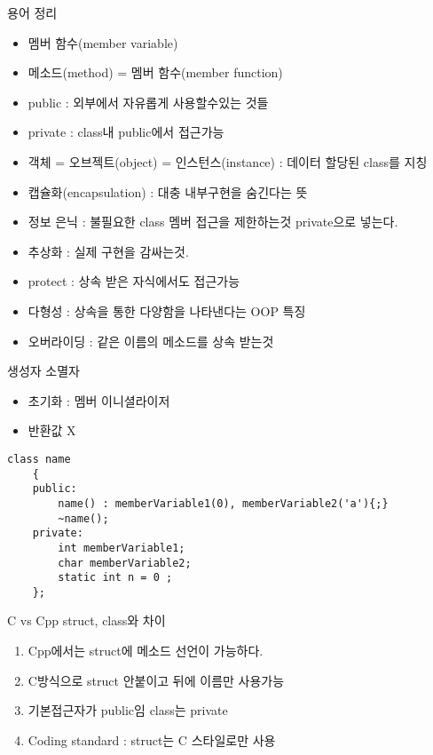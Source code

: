 \documentclass[10pt]{beamer}
\begin{document}
\begin{frame}{용어 정리}
    \begin{itemize}
        \item 멤버 함수(member variable)
        \item 메소드(method) = 멤버 함수(member function)
        \item public : 외부에서 자유롭게 사용할수있는 것들
        \item private : class내 public에서 접근가능
        \item 객체 = 오브젝트(object) = 인스턴스(instance) : 데이터 할당된 class를 지칭
        \item 캡슐화(encapsulation) : 대충 내부구현을 숨긴다는 뜻
        \item 정보 은닉 : 불필요한 class 멤버 접근을 제한하는것 private으로 넣는다.
        \item 추상화 : 실제 구현을 감싸는것.
        \item protect : 상속 받은 자식에서도 접근가능
        \item 다형성 : 상속을 통한 다양함을 나타낸다는 OOP 특징
        \item 오버라이딩 : 같은 이름의 메소드를 상속 받는것
    \end{itemize}
\end{frame}

\begin{frame}[fragile]{생성자 소멸자}
    \begin{itemize}
        \item 초기화 : 멤버 이니셜라이저
        \item 반환값 X
    \end{itemize}
    
    \begin{lstlisting}[style = CStyle]
    class name
    {
    public:
        name() : memberVariable1(0), memberVariable2('a'){;}
        ~name();
    private:
        int memberVariable1;
        char memberVariable2;
        static int n = 0 ;
    };
    \end{lstlisting}
\end{frame}    




\begin{frame}{C vs Cpp struct, class와 차이}
    \begin{enumerate}
        \item Cpp에서는 struct에 메소드 선언이 가능하다.
        \item C방식으로 struct 안붙이고 뒤에 이름만 사용가능
        \item 기본접근자가 public임 class는 private
        \item Coding standard : struct는 C 스타일로만 사용
    \end{enumerate}
\end{frame}    
\end{document}
